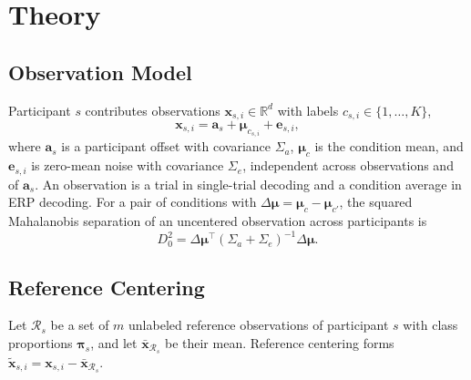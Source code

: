 \section{Theory}\label{sec:theory}

\subsection{Observation Model}
Participant $s$ contributes observations $\mathbf{x}_{s,i}\in\mathbb{R}^d$ with labels $c_{s,i}\in\{1,\dots,K\}$,
\begin{equation}
\mathbf{x}_{s,i}=\mathbf{a}_s+\boldsymbol\mu_{c_{s,i}}+\mathbf{e}_{s,i}, \label{eq:model}
\end{equation}
where $\mathbf{a}_s$ is a participant offset with covariance $\Sigma_a$, $\boldsymbol\mu_c$ is the condition mean, and $\mathbf{e}_{s,i}$ is zero-mean noise with covariance $\Sigma_e$, independent across observations and of $\mathbf{a}_s$. An observation is a trial in single-trial decoding and a condition average in ERP decoding. For a pair of conditions with $\Delta\boldsymbol\mu=\boldsymbol\mu_c-\boldsymbol\mu_{c'}$, the squared Mahalanobis separation of an uncentered observation across participants is
\begin{equation}
D_0^2=\Delta\boldsymbol\mu^\top(\Sigma_a+\Sigma_e)^{-1}\Delta\boldsymbol\mu. \label{eq:d0}
\end{equation}

\subsection{Reference Centering}
Let $\mathcal{R}_s$ be a set of $m$ unlabeled reference observations of participant $s$ with class proportions $\boldsymbol\pi_s$, and let $\bar{\mathbf{x}}_{\mathcal{R}_s}$ be their mean. Reference centering forms $\tilde{\mathbf{x}}_{s,i}=\mathbf{x}_{s,i}-\bar{\mathbf{x}}_{\mathcal{R}_s}$.


